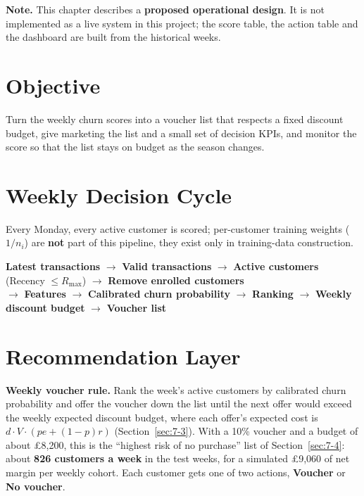 \textbf{Note.} This chapter describes a \textbf{proposed operational design}. It is not implemented as a live system in this project; the score table, the action table and the dashboard are built from the historical weeks.

\section{Objective}
\label{sec:8-1}

Turn the weekly churn scores into a voucher list that respects a fixed discount budget, give marketing the list and a small set of decision KPIs, and monitor the score so that the list stays on budget as the season changes.

\section{Weekly Decision Cycle}
\label{sec:8-2}

Every Monday, every active customer is scored; per-customer training weights ($1/n_i$) are \textbf{not} part of this pipeline, they exist only in training-data construction.

\begin{center}
\textbf{Latest transactions} $\rightarrow$ \textbf{Valid transactions} $\rightarrow$ \textbf{Active customers} (Recency $\leq R_{\max}$) $\rightarrow$ \textbf{Remove enrolled customers} \\[0.3cm]
$\rightarrow$ \textbf{Features} $\rightarrow$ \textbf{Calibrated churn probability} $\rightarrow$ \textbf{Ranking} $\rightarrow$ \textbf{Weekly discount budget} $\rightarrow$ \textbf{Voucher list}
\end{center}

\section{Recommendation Layer}
\label{sec:8-3}

\textbf{Weekly voucher rule.} Rank the week's active customers by calibrated churn probability and offer the voucher down the list until the next offer would exceed the weekly expected discount budget, where each offer's expected cost is $d \cdot V \cdot (p e + (1 - p) r)$ (Section~\ref{sec:7-3}). With a 10\% voucher and a budget of about \pounds8,200, this is the ``highest risk of no purchase'' list of Section~\ref{sec:7-4}: about \textbf{826 customers a week} in the test weeks, for a simulated \pounds9,060 of net margin per weekly cohort. Each customer gets one of two actions, \textbf{Voucher} or \textbf{No voucher}.

